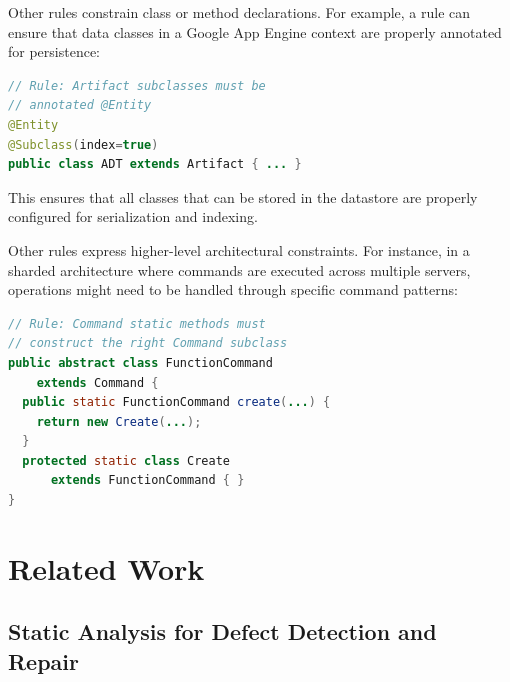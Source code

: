 \documentclass[conference]{IEEEtran}
\begin{document}
Other rules constrain class or method declarations. For example, a rule can ensure that data classes in a Google App Engine context are properly annotated for persistence:

\begin{lstlisting}[language=Java,caption={Annotation-based design rule example}]
// Rule: Artifact subclasses must be 
// annotated @Entity
@Entity
@Subclass(index=true)
public class ADT extends Artifact { ... }
\end{lstlisting}

This ensures that all classes that can be stored in the datastore are properly configured for serialization and indexing.

Other rules express higher-level architectural constraints. For instance, in a sharded architecture where commands are executed across multiple servers, operations might need to be handled through specific command patterns:

\begin{lstlisting}[language=Java,caption={Architectural design rule example}]
// Rule: Command static methods must 
// construct the right Command subclass
public abstract class FunctionCommand 
    extends Command {
  public static FunctionCommand create(...) {
    return new Create(...);
  }
  protected static class Create 
      extends FunctionCommand { }
}
\end{lstlisting}

\section{Related Work}

\subsection{Static Analysis for Defect Detection and Repair}
\end{document}
